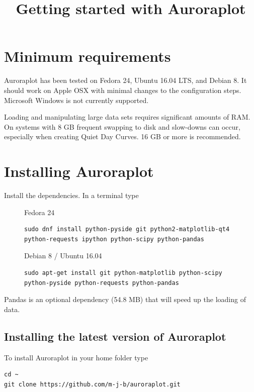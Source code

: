 \documentclass{article}
\begin{document}
\title{Getting started with Auroraplot}
\date{}
\maketitle

\section{Minimum requirements}
Auroraplot has been tested on Fedora 24, Ubuntu 16.04 LTS, and Debian 8.
It should work on Apple OSX with minimal changes to the configuration steps.
Microsoft Windows is not currently supported.

Loading and manipulating large data sets requires significant amounts of RAM.
On systems with 8 GB frequent swapping to disk and slow-downs can occur,
especially when creating Quiet Day Curves. 16 GB or more is recommended.

\section{Installing Auroraplot}
\label{install}

Install the dependencies. In a terminal type

\begin{figure}[htb!]
\begin{minipage}[b]{0.45\linewidth}
Fedora 24
\begin{lstlisting}
sudo dnf install python-pyside git python2-matplotlib-qt4 python-requests ipython python-scipy python-pandas
\end{lstlisting}
\end{minipage}
\hspace{0.5cm}
\begin{minipage}[b]{0.45\linewidth}
Debian 8 / Ubuntu 16.04
\begin{lstlisting}                 
sudo apt-get install git python-matplotlib python-scipy python-pyside python-requests python-pandas 
\end{lstlisting}
\end{minipage} 
\end{figure}

Pandas is an optional dependency (54.8 MB) that will speed up the loading of data.

\subsection{Installing the latest version of Auroraplot}
To install Auroraplot in your home folder type
\begin{lstlisting}
cd ~
git clone https://github.com/m-j-b/auroraplot.git
\end{lstlisting}
\end{document}
